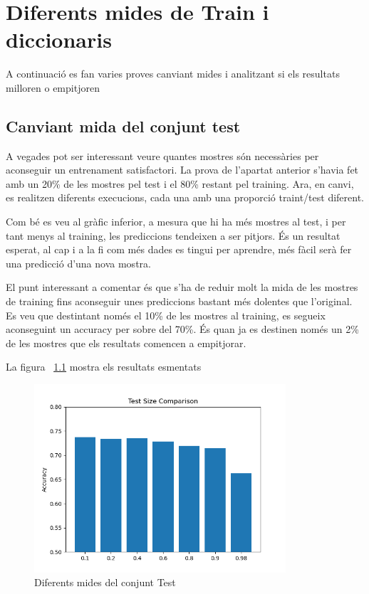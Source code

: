 \chapter{Diferents mides de Train i diccionaris}
A continuació es fan varies proves canviant mides i analitzant si els resultats milloren o empitjoren
\section{Canviant mida del conjunt test}
A vegades pot ser interessant veure quantes mostres són necessàries per aconseguir un entrenament satisfactori. La prova de l’apartat anterior s’havia fet amb un 20\% de les mostres pel test i el 80\% restant pel training. Ara, en canvi, es realitzen diferents execucions, cada una amb una proporció traint/test diferent. 

Com bé es veu al gràfic inferior, a mesura que hi ha més mostres al test, i per tant menys al training, les prediccions tendeixen a ser pitjors. És un resultat esperat, al cap i a la fi com més dades es tingui per aprendre, més fàcil serà fer una predicció d’una nova mostra. 

El punt interessant a comentar és que s’ha de reduir molt la mida de les mostres de training fins aconseguir unes prediccions bastant més dolentes que l’original. Es veu que destintant només el 10\% de les mostres al training, es segueix aconseguint un accuracy per sobre del 70\%. És quan ja es destinen només un 2\% de les mostres que els resultats comencen a empitjorar.

La figura ~\ref{fig:test_size} mostra els resultats esmentats
\begin{figure}[h]
    \centering
    \includegraphics[height=7cm,keepaspectratio]{images/image3.png}
    \caption{Diferents mides del conjunt Test}
    \label{fig:test_size}
\end{figure}
